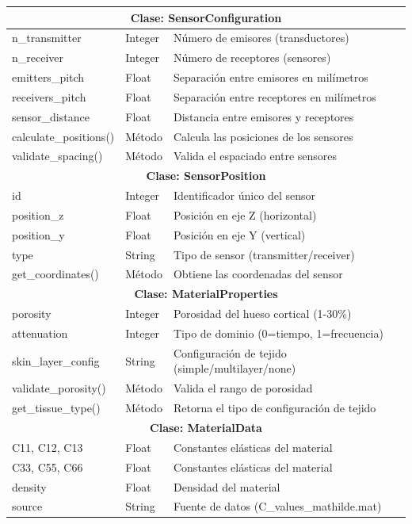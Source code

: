 \begin{longtable}{|p{3cm}|p{2cm}|p{8cm}|}
\hline
\multicolumn{3}{|c|}{\textbf{Clase: SensorConfiguration}} \\
\hline
n\_transmitter & Integer & Número de emisores (transductores) \\
n\_receiver & Integer & Número de receptores (sensores) \\
emitters\_pitch & Float & Separación entre emisores en milímetros \\
receivers\_pitch & Float & Separación entre receptores en milímetros \\
sensor\_distance & Float & Distancia entre emisores y receptores \\
calculate\_positions() & Método & Calcula las posiciones de los sensores \\
validate\_spacing() & Método & Valida el espaciado entre sensores \\
\hline
\multicolumn{3}{|c|}{\textbf{Clase: SensorPosition}} \\
\hline
id & Integer & Identificador único del sensor \\
position\_z & Float & Posición en eje Z (horizontal) \\
position\_y & Float & Posición en eje Y (vertical) \\
type & String & Tipo de sensor (transmitter/receiver) \\
get\_coordinates() & Método & Obtiene las coordenadas del sensor \\
\hline
\multicolumn{3}{|c|}{\textbf{Clase: MaterialProperties}} \\
\hline
porosity & Integer & Porosidad del hueso cortical (1-30\%) \\
attenuation & Integer & Tipo de dominio (0=tiempo, 1=frecuencia) \\
skin\_layer\_config & String & Configuración de tejido (simple/multilayer/none) \\
validate\_porosity() & Método & Valida el rango de porosidad \\
get\_tissue\_type() & Método & Retorna el tipo de configuración de tejido \\
\hline
\multicolumn{3}{|c|}{\textbf{Clase: MaterialData}} \\
\hline
C11, C12, C13 & Float & Constantes elásticas del material \\
C33, C55, C66 & Float & Constantes elásticas del material \\
density & Float & Densidad del material \\
source & String & Fuente de datos (C\_values\_mathilde.mat) \\

\end{longtable}
